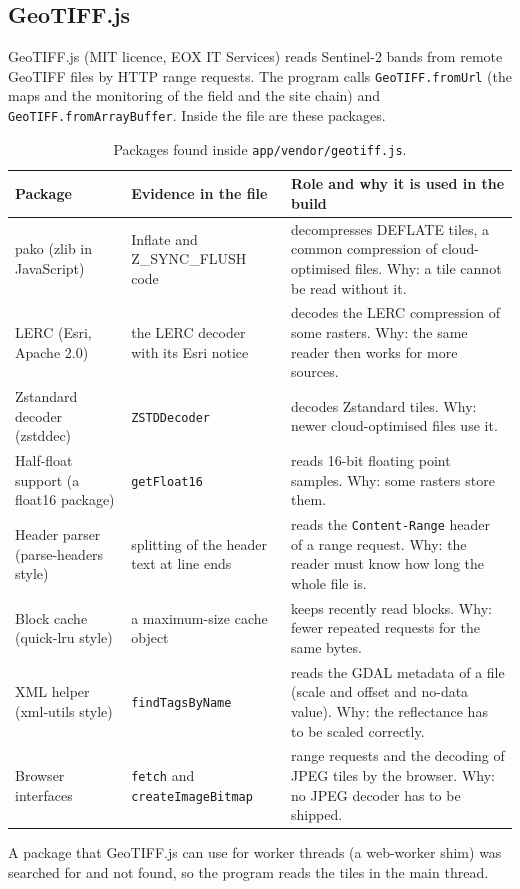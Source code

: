 \subsection{GeoTIFF.js}
GeoTIFF.js (MIT licence, EOX IT Services) reads Sentinel-2 bands from remote GeoTIFF files by HTTP range requests. The program calls \texttt{GeoTIFF.fromUrl} (the maps and the monitoring of the field and the site chain) and \texttt{GeoTIFF.fromArrayBuffer}. Inside the file are these packages.
\begin{table}[H]\centering\small
\caption{Packages found inside \texttt{app/vendor/geotiff.js}.}\label{tab:geotiff}
\begin{tabular}{@{}>{\raggedright\arraybackslash}p{3.0cm}>{\raggedright\arraybackslash}p{3.0cm}>{\raggedright\arraybackslash}p{7.0cm}@{}}
\toprule Package & Evidence in the file & Role and why it is used in the build\\\midrule
pako (zlib in JavaScript) & Inflate and Z\_SYNC\_FLUSH code & decompresses DEFLATE tiles, a common compression of cloud-optimised files. Why: a tile cannot be read without it.\\
LERC (Esri, Apache 2.0) & the LERC decoder with its Esri notice & decodes the LERC compression of some rasters. Why: the same reader then works for more sources.\\
Zstandard decoder (zstddec) & \texttt{ZSTDDecoder} & decodes Zstandard tiles. Why: newer cloud-optimised files use it.\\
Half-float support (a float16 package) & \texttt{getFloat16} & reads 16-bit floating point samples. Why: some rasters store them.\\
Header parser (parse-headers style) & splitting of the header text at line ends & reads the \texttt{Content-Range} header of a range request. Why: the reader must know how long the whole file is.\\
Block cache (quick-lru style) & a maximum-size cache object & keeps recently read blocks. Why: fewer repeated requests for the same bytes.\\
XML helper (xml-utils style) & \texttt{findTagsByName} & reads the GDAL metadata of a file (scale and offset and no-data value). Why: the reflectance has to be scaled correctly.\\
Browser interfaces & \texttt{fetch} and \texttt{createImageBitmap} & range requests and the decoding of JPEG tiles by the browser. Why: no JPEG decoder has to be shipped.\\
\bottomrule\end{tabular}\end{table}
A package that GeoTIFF.js can use for worker threads (a web-worker shim) was searched for and not found, so the program reads the tiles in the main thread.

